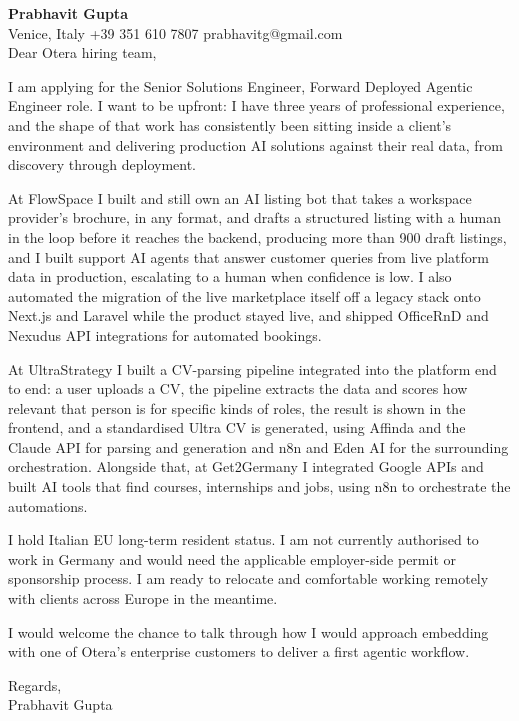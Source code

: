 \documentclass[a4paper,10.5pt]{article}
\begin{document}
\textbf{Prabhavit Gupta}\\
Venice, Italy \textbar{} +39 351 610 7807 \textbar{} prabhavitg@gmail.com\\[10pt]
Dear Otera hiring team,

I am applying for the Senior Solutions Engineer, Forward Deployed Agentic Engineer role. I want to be upfront: I have three years of professional experience, and the shape of that work has consistently been sitting inside a client's environment and delivering production AI solutions against their real data, from discovery through deployment.

At FlowSpace I built and still own an AI listing bot that takes a workspace provider's brochure, in any format, and drafts a structured listing with a human in the loop before it reaches the backend, producing more than 900 draft listings, and I built support AI agents that answer customer queries from live platform data in production, escalating to a human when confidence is low. I also automated the migration of the live marketplace itself off a legacy stack onto Next.js and Laravel while the product stayed live, and shipped OfficeRnD and Nexudus API integrations for automated bookings.

At UltraStrategy I built a CV-parsing pipeline integrated into the platform end to end: a user uploads a CV, the pipeline extracts the data and scores how relevant that person is for specific kinds of roles, the result is shown in the frontend, and a standardised Ultra CV is generated, using Affinda and the Claude API for parsing and generation and n8n and Eden AI for the surrounding orchestration. Alongside that, at Get2Germany I integrated Google APIs and built AI tools that find courses, internships and jobs, using n8n to orchestrate the automations.

I hold Italian EU long-term resident status. I am not currently authorised to work in Germany and would need the applicable employer-side permit or sponsorship process. I am ready to relocate and comfortable working remotely with clients across Europe in the meantime.

I would welcome the chance to talk through how I would approach embedding with one of Otera's enterprise customers to deliver a first agentic workflow.

Regards,\\
Prabhavit Gupta
\end{document}
